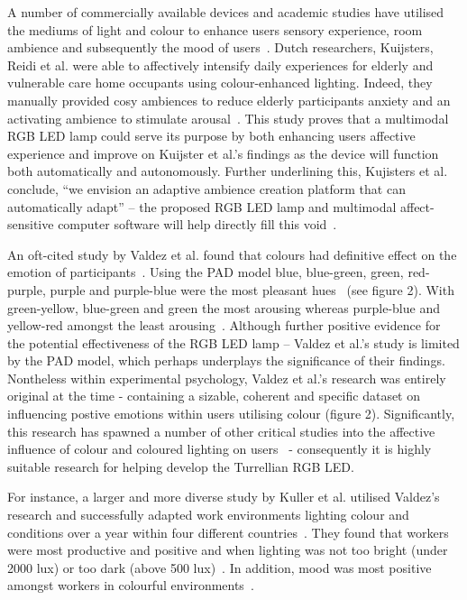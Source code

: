 \documentclass{sigchi}
\begin{document}
A number of commercially available devices and academic studies have utilised the mediums of light and colour to enhance users sensory experience, room ambience and subsequently the mood of users~\cite{flores2017effect, kuijsters2011improving, kuijsters2015lighting}. Dutch researchers, Kuijsters, Reidi et al. were able to affectively intensify daily experiences for elderly and vulnerable care home occupants using colour-enhanced lighting. Indeed, they manually provided cosy ambiences to reduce elderly participants anxiety and an activating ambience to stimulate arousal~\cite{kuijsters2015lighting}. This study proves that a multimodal RGB LED lamp could serve its purpose by both enhancing users affective experience and improve on Kuijster et al.’s findings as the device will function both automatically and autonomously. Further underlining this, Kujisters et al. conclude, “we envision an adaptive ambience creation platform that can automatically adapt” – the proposed RGB LED lamp and multimodal affect-sensitive computer software will help directly fill this void~\cite{kuijsters2015lighting}.

An oft-cited study by Valdez et al. found that colours had definitive effect on the emotion of participants~\cite{valdez1994effects}. Using the PAD model blue, blue-green, green, red-purple, purple and purple-blue were the most pleasant hues~\cite{valdez1994effects} (see figure 2). With green-yellow, blue-green and green the most arousing whereas purple-blue and yellow-red amongst the least arousing~\cite{valdez1994effects}. Although further positive evidence for the potential effectiveness of the RGB LED lamp – Valdez et al.’s study is limited by the PAD model, which perhaps underplays the significance of their findings. Nontheless within experimental psychology, Valdez et al.'s research was entirely original at the time -  containing a sizable, coherent and specific dataset on influencing postive emotions within users utilising colour (figure 2). Significantly, this research has spawned a number of other critical studies into the affective influence of colour and coloured lighting on users~\cite{han2017effects, jo2014smart, kim2014study, lee2019effects, wardono2012effects, yang2015lighting} - consequently it is highly suitable research for helping develop the Turrellian RGB LED.

For instance, a larger and more diverse study by Kuller et al. utilised Valdez’s research and successfully adapted work environments lighting colour and conditions over a year within four different countries~\cite{kuller2006impact, kuller2009color}. They found that workers were most productive and positive and when lighting was not too bright (under 2000 lux) or too dark (above 500 lux)~\cite{kuller2006impact, kuller2009color}. In addition, mood was most positive amongst workers in colourful environments~\cite{kuller1986physiological}.
\end{document}
